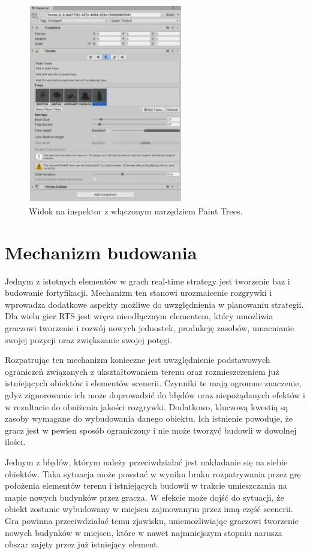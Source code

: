 \begin{figure}[htbp]
    \centering
    \includegraphics[width=0.6\textwidth]{images/modelowanie_terenu/malowanie_drzew.jpg}
    \caption{Widok na inspektor z włączonym narzędziem Paint Trees.}\label{fig:malowanie_drzew}
\end{figure}


\section{Mechanizm budowania}\label{chap:build}
Jednym z istotnych elementów w grach real-time strategy jest tworzenie baz i budowanie fortyfikacji. Mechanizm ten stanowi urozmaicenie rozgrywki i wprowadza dodatkowe aspekty możliwe do uwzględnienia w planowaniu strategii. Dla wielu gier RTS jest wręcz nieodłącznym elementem, który umożliwia graczowi tworzenie i rozwój nowych jednostek, produkcję zasobów, umacnianie swojej pozycji oraz zwiększanie swojej potęgi.

Rozpatrując ten mechanizm konieczne jest uwzględnienie podstawowych ograniczeń związanych z ukształtowaniem terenu oraz rozmieszczeniem już istniejących obiektów i elementów scenerii. Czynniki te mają ogromne znaczenie, gdyż zignorowanie ich może doprowadzić do błędów oraz niepożądanych efektów i w rezultacie do obniżenia jakości rozgrywki. Dodatkowo, kluczową kwestią są zasoby wymagane do wybudowania danego obiektu. Ich istnienie powoduje, że gracz jest w pewien sposób ograniczony i nie może tworzyć budowli w dowolnej ilości.

Jednym z błędów, którym należy przeciwdziałać jest nakładanie się na siebie obiektów. Taka sytuacja może powstać w wyniku braku rozpatrywania przez grę położenia elementów terenu i istniejących budowli w trakcie umieszczania na mapie nowych budynków przez gracza. W efekcie może dojść do sytuacji, że obiekt zostanie wybudowany w miejscu zajmowanym przez inną część scenerii. Gra powinna przeciwdziałać temu zjawisku, uniemożliwiając graczowi tworzenie nowych budynków w miejscu, które w nawet najmniejszym stopniu narusza obszar zajęty przez już istniejący element.

